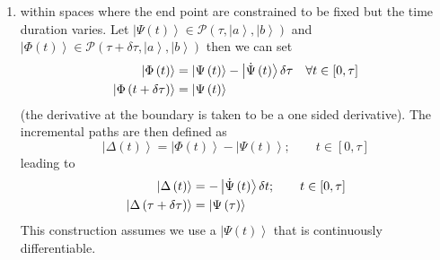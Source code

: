 \documentclass[aps,preprint]{revtex4}
\begin{document}
\begin{enumerate}
\item within spaces where the end point are constrained to be fixed but the
time duration varies. Let $\left\vert \Psi \left( t\right) \right\rangle \in 
\mathcal{P}\left( \tau ,\left\vert a\right\rangle ,\left\vert b\right\rangle
\right) $ and $\left\vert \Phi \left( t\right) \right\rangle \in \mathcal{P}%
\left( \tau +\delta \tau ,\left\vert a\right\rangle ,\left\vert
b\right\rangle \right) $ then we can set 
\begin{align}
\left\vert \Phi \left( t\right) \right\rangle & =\left\vert \Psi \left(
t\right) \right\rangle -\left\vert \dot{\Psi}\left( t\right) \right\rangle
\delta \tau \quad \forall t\in \left[ 0,\tau \right]   \notag \\
\left\vert \Phi \left( t+\delta \tau \right) \right\rangle & =\left\vert
\Psi \left( t\right) \right\rangle 
\end{align}%
(the derivative at the boundary is taken to be a one sided derivative). The
incremental paths are then defined as 
\begin{equation}
\left\vert \Delta \left( t\right) \right\rangle =\left\vert \Phi \left(
t\right) \right\rangle -\left\vert \Psi \left( t\right) \right\rangle
;\qquad t\in \left[ 0,\tau \right] 
\end{equation}%
leading to 
\begin{align}
\left\vert \Delta \left( t\right) \right\rangle & =-\left\vert \dot{\Psi}%
\left( t\right) \right\rangle \delta t;\qquad t\in \left[ 0,\tau \right]  
\notag \\
\left\vert \Delta \left( \tau +\delta \tau \right) \right\rangle &
=\left\vert \Psi \left( \tau \right) \right\rangle 
\end{align}%
This construction assumes we use a $\left\vert \Psi \left( t\right)
\right\rangle $ that is continuously differentiable.


\end{enumerate}
\end{document}
